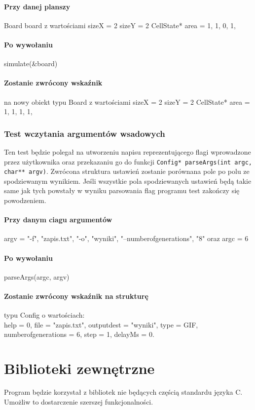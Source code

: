 \documentclass{mwart}
\begin{document}
\paragraph{Przy danej planszy} Board board z wartościami sizeX = 2 sizeY = 2 CellState* area = {1, 1, 0, 1,}
\paragraph{Po wywołaniu} simulate(\&board)
\paragraph{Zostanie zwrócony wskaźnik} na nowy obiekt typu Board z wartościami sizeX = 2 sizeY = 2 CellState* area = {1, 1, 1, 1,}

\subsubsection{Test wczytania argumentów wsadowych}
Ten test będzie polegał na utworzeniu napisu reprezentującego flagi wprowadzone przez użytkownika oraz przekazaniu go do funkcji \texttt{Config* parseArgs(int argc, char** argv)}. Zwrócona struktura ustawień zostanie porównana pole po polu ze spodziewanym wynikiem. Jeśli wszystkie pola spodziewanych ustawień będą takie same jak tych powstały w wyniku parsowania flag programu test zakończy się powodzeniem.

\paragraph{Przy danym ciagu argumentów} argv = {"-f", "zapis.txt", "-o", "wyniki", "--number\textunderscore{}of\textunderscore{}generations", "8"} oraz argc = 6
\paragraph{Po wywołaniu} parseArgs(argc, argv)
\paragraph{Zostanie zwrócony wskaźnik na strukturę} typu Config o wartościach: \\ help = 0, file = "zapis.txt", output\textunderscore{}dest = "wyniki", type = GIF, \\ number\textunderscore{}of\textunderscore{}generations = 6, step = 1, delayMs = 0.

\section{Biblioteki zewnętrzne}
Program będzie korzystał z bibliotek nie będących częścią standardu języka C. Umożliw to dostarczenie szerszej funkcjonalności.
\end{document}
